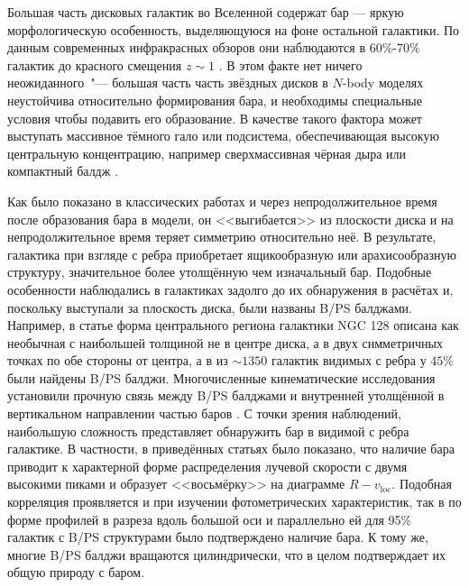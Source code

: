 \documentclass{trlnotes}
\begin{document}
Большая часть дисковых галактик во Вселенной содержат бар --- яркую морфологическую особенность, выделяющуюся на 
фоне остальной галактики. По данным современных инфракрасных 
обзоров они наблюдаются в 60\%-70\% галактик до красного смещения $z\sim 1$ \citep{marinova2007}.
В этом факте нет ничего неожиданного~"--- большая часть часть звёздных дисков в $N$-body моделях неустойчива
относительно формирования бара, и необходимы специальные условия чтобы подавить его образование. В качестве такого
фактора может выступать массивное тёмного гало \underdev или подсистема, обеспечивающая высокую
центральную концентрацию, например сверхмассивная чёрная дыра \citep{shen2004} или компактный балдж
\citep{saha2018}.

%
Как было показано в классических работах \citet{combes1981a} и \citet{raha1991} через непродолжительное время после
образования бара в модели, он <<выгибается>> из плоскости диска и на непродолжительное время теряет симметрию относительно неё. В
результате, галактика при взгляде с ребра приобретает ящикообразную или арахисообразную структуру, значительное
более утолщённую чем изначальный бар. Подобные особенности наблюдались в галактиках задолго до их обнаружения в
расчётах и, поскольку выступали за плоскость диска, были названы B/PS балджами. Например, в статье
\citet{burbidge1959} форма центрального региона галактики NGC 128 описана как необычная с наибольшей толщиной не в
центре диска, а в двух симметричных точках по обе стороны от центра, а в \citet{lutticke2000} из $\sim\!1350$ галактик видимых с ребра у $45\%$ были найдены B/PS балджи.
Многочисленные кинематические исследования установили прочную связь между B/PS балджами и внутренней утолщённой в вертикальном направлении частью баров
\citep{kuijken1995,bureau1999,chung2004,bureau2006}. С точки зрения наблюдений,
наибольшую сложность представляет обнаружить бар в видимой с ребра галактике. В частности, в приведённых статьях
было показано, что наличие бара приводит к характерной форме распределения лучевой скорости с двумя высокими пиками и образует <<восьмёрку>> на диаграмме $R - v_{\text{loc}}$. 
Подобная корреляция проявляется и при изучении фотометрических характеристик, так в \citet{lutticke2000a} по форме
профилей в разреза вдоль большой оси и параллельно ей для 95\% галактик с B/PS структурами было подтверждено наличие бара. 
К тому же, многие B/PS балджи вращаются цилиндрически, что в целом подтверждает их общую природу с баром. 
 
\end{document}
